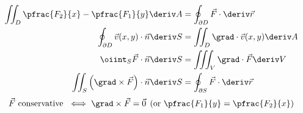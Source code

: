 \documentclass[10pt, a4paper]{article}
\begin{document}
\begin{multicols}{2}
\begin{align*}
    \end{align*}
    \begin{align*}
        \iint_{D} \pfrac{F_2}{x} - \pfrac{F_1}{y} \deriv A 
            &= \oint_{\partial D} \vec{F} \cdot \deriv \vec{r} \\
        \oint_{\partial D} \vec{v}(x, y) \cdot \vec{n} \deriv S
            &= \iint_{D} \grad \cdot \vec{v}(x, y) \deriv A \\
        \oiint_{S} \vec{F} \cdot \vec{n} \deriv S 
            &= \iiint_{V} \grad \cdot \vec{F} \deriv V \\
        \iint_{S} \left(\grad \times \vec{F}\right) \cdot \vec{n} \deriv S
            &= \oint_{\partial S} \vec{F} \cdot \deriv \vec{r}
    \end{align*}
    \[
        \vec{F} \text{ conservative } \iff \grad \times \vec{F} = \vec{0} \; \left(\text{or \(\pfrac{F_1}{y} = \pfrac{F_2}{x}\)}\right) 
    \]
\end{multicols}
\end{document}
